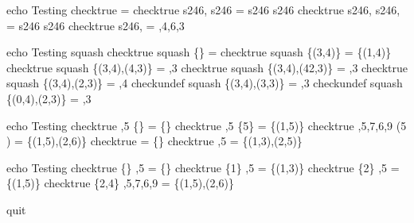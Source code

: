 echo    Testing \dcat
checktrue \dcat \langle \rangle = \langle \rangle
checktrue \dcat \langle s246, s246 \rangle = s246 \cat s246
checktrue \dcat \langle s246, s246, \emptyset \rangle = s246 \cat s246
checktrue \dcat \langle s246,  \rangle \rangle = ,4,6,3 \rangle

echo    Testing squash
checktrue squash \{\} = \langle \rangle
checktrue squash \{(3,4)\} = \{(1,4)\}
checktrue squash \{(3,4),(4,3)\} = ,3 \rangle
checktrue squash \{(3,4),(42,3)\} = ,3 \rangle
checktrue squash \{(3,4),(2,3)\} = ,4 \rangle
checkundef squash \{(3,4),(3,3)\} = ,3 \rangle
checkundef squash \{(0,4),(2,3)\} = ,3 \rangle

echo    Testing \filter
checktrue ,5 \rangle \filter \{\} = \{\}
checktrue ,5 \rangle \filter \{5\} = \{(1,5)\}
checktrue ,5,7,6,9 \rangle \filter (5 ) = \{(1,5),(2,6)\}
checktrue \langle \rangle \filter \nat = \{\}
checktrue ,5 \rangle \filter \nat = \{(1,3),(2,5)\}

echo    Testing \filter
checktrue \{\} \extract {},5 \rangle = \{\}
checktrue \{1\} \extract {},5 \rangle = \{(1,3)\}
checktrue \{2\} \extract {},5 \rangle = \{(1,5)\}
checktrue \{2,4\} \extract {},5,7,6,9 \rangle = \{(1,5),(2,6)\}

quit
